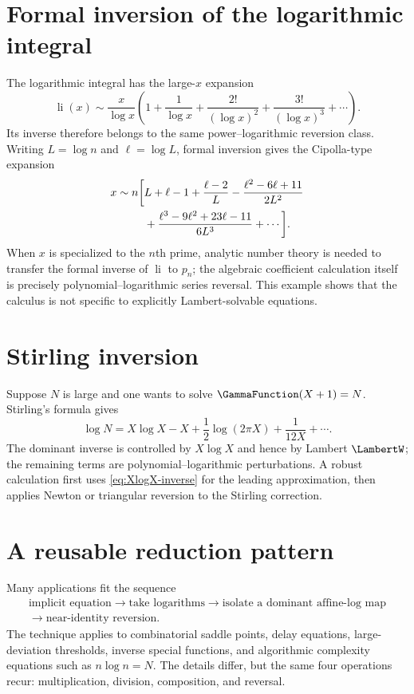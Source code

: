 \documentclass[11pt,oneside]{book}
\theoremstyle{definition}
\theoremstyle{remark}
\begin{document}
\section{Formal inversion of the logarithmic integral}
The logarithmic integral has the large-$x$ expansion
\begin{equation}\label{eq:li-expansion}
 \operatorname{li}(x)
 \sim\frac{x}{\log x}
 \left(1+\frac1{\log x}+\frac{2!}{(\log x)^2}
 +\frac{3!}{(\log x)^3}+\cdots\right).
\end{equation}
Its inverse therefore belongs to the same power--logarithmic reversion class.
Writing $L=\log n$ and $\ell=\log L$, formal inversion gives the Cipolla-type
expansion
\begin{align}\label{eq:nth-prime-formal}
 x\sim n\biggl[&L+\ell-1+\frac{\ell-2}{L}
 -\frac{\ell^2-6\ell+11}{2L^2}\\
 &+\frac{\ell^3-9\ell^2+23\ell-11}{6L^3}
 +\cdots\biggr].\notag
\end{align}
When $x$ is specialized to the $n$th prime, analytic number theory is needed
to transfer the formal inverse of $\operatorname{li}$ to $p_n$; the algebraic
coefficient calculation itself is precisely polynomial--logarithmic series
reversal.  This example shows that the calculus is not specific to explicitly
Lambert-solvable equations.

\section{Stirling inversion}
Suppose $N$ is large and one wants to solve
$\GammaFunction(X+1)=N$.  Stirling's
formula gives
\[
 \log N=X\log X-X+\frac12\log(2\pi X)
 +\frac1{12X}+\cdots.
\]
The dominant inverse is controlled by $X\log X$ and hence by Lambert $\LambertW$;
the remaining terms are polynomial--logarithmic perturbations.  A robust
calculation first uses \eqref{eq:XlogX-inverse} for the leading approximation,
then applies Newton or triangular reversion to the Stirling correction.

\section{A reusable reduction pattern}
Many applications fit the sequence
\[
 \begin{gathered}
 \text{implicit equation}
 \longrightarrow \text{take logarithms}
 \longrightarrow \text{isolate a dominant affine-log map}\\
 \longrightarrow \text{near-identity reversion}.
 \end{gathered}
\]
The technique applies to combinatorial saddle points, delay equations,
large-deviation thresholds, inverse special functions, and algorithmic
complexity equations such as $n\log n=N$.  The details differ, but the same
four operations recur: multiplication, division, composition, and reversal.
\end{document}
